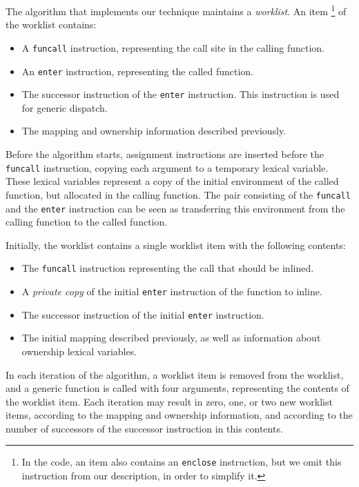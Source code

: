 The algorithm that implements our technique maintains a
\emph{worklist}.  An item%
\footnote{In the code, an item also contains an \texttt{enclose}
  instruction, but we omit this instruction from our description, in
  order to simplify it.}
of the worklist contains:

\begin{itemize}
\item A \texttt{funcall} instruction, representing the call site in the
  calling function.
\item An \texttt{enter} instruction, representing the called function.
\item The successor instruction of the \texttt{enter} instruction.
  This instruction is used for generic dispatch.
\item The mapping and ownership information described previously.
\end{itemize}

Before the algorithm starts, assignment instructions are inserted
before the \texttt{funcall} instruction, copying each argument to a
temporary lexical variable.  These lexical variables represent a copy
of the initial environment of the called function, but allocated in
the calling function.  The pair consisting of the \texttt{funcall} and
the \texttt{enter} instruction can be seen as transferring this
environment from the calling function to the called function.

Initially, the worklist contains a single worklist item with the
following contents:

\begin{itemize}
\item The \texttt{funcall} instruction representing the call that
  should be inlined.
\item A \emph{private copy} of the initial \texttt{enter} instruction
  of the function to inline.
\item The successor instruction of the initial \texttt{enter}
  instruction.
\item The initial mapping described previously, as well as
  information about ownership lexical variables.
\end{itemize}

In each iteration of the algorithm, a worklist item is removed from
the worklist, and a generic function is called with four arguments,
representing the contents of the worklist item.  Each iteration may
result in zero, one, or two new worklist items, according to the
mapping and ownership information, and according to the number of
successors of the successor instruction in this contents.

